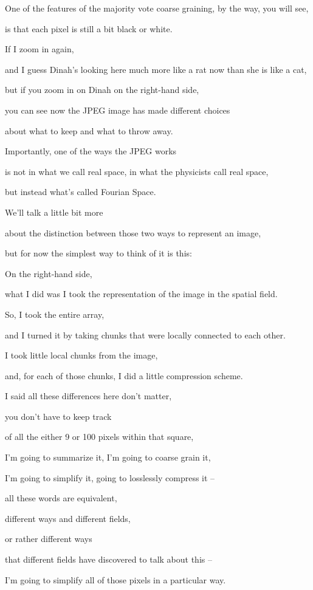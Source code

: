 \documentclass[]{article}
\begin{document}
One of the features of the majority vote
coarse graining, by the way, you will see,

is that each pixel
is still a bit black or white.

If I zoom in again,

and I guess Dinah's looking here much more
like a rat now than she is like a cat,

but if you zoom in on Dinah
on the right-hand side,

you can see now the JPEG image
has made different choices

about what to keep and what to throw away.

Importantly, one of the ways
the JPEG works

is not in what we call real space,
in what the physicists call real space,

but instead what's called Fourian Space.

We'll talk a little bit more

about the distinction between
those two ways to represent an image,

but for now the simplest way
to think of it is this:

On the right-hand side,

what I did was I took the representation
of the image in the spatial field.

So, I took the entire array,

and I turned it by taking chunks
that were locally connected to each other.

I took little local chunks from the image,

and, for each of those chunks,
I did a little compression scheme.

I said all these differences here
don't matter,

you don't have to keep track

of all the either 9 or 100 pixels
within that square,

I'm going to summarize it,
I'm going to coarse grain it,

I'm going to simplify it,
going to losslessly compress it –

all these words are equivalent,

different ways and different fields,

or rather different ways

that different fields
have discovered to talk about this –

I'm going to simplify all of those pixels
in a particular way.
\end{document}
